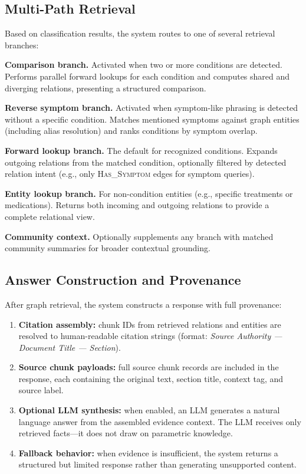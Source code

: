 \documentclass[12pt,a4paper]{article}
\begin{document}
\subsection{Multi-Path Retrieval}

Based on classification results, the system routes to one of several retrieval branches:

\textbf{Comparison branch.} Activated when two or more conditions are detected. Performs parallel forward lookups for each condition and computes shared and diverging relations, presenting a structured comparison.

\textbf{Reverse symptom branch.} Activated when symptom-like phrasing is detected without a specific condition. Matches mentioned symptoms against graph entities (including alias resolution) and ranks conditions by symptom overlap.

\textbf{Forward lookup branch.} The default for recognized conditions. Expands outgoing relations from the matched condition, optionally filtered by detected relation intent (e.g., only \textsc{Has\_Symptom} edges for symptom queries).

\textbf{Entity lookup branch.} For non-condition entities (e.g., specific treatments or medications). Returns both incoming and outgoing relations to provide a complete relational view.

\textbf{Community context.} Optionally supplements any branch with matched community summaries for broader contextual grounding.

\subsection{Answer Construction and Provenance}

After graph retrieval, the system constructs a response with full provenance:

\begin{enumerate}[nosep]
    \item \textbf{Citation assembly:} chunk IDs from retrieved relations and entities are resolved to human-readable citation strings (format: \textit{Source Authority --- Document Title --- Section}).
    \item \textbf{Source chunk payloads:} full source chunk records are included in the response, each containing the original text, section title, context tag, and source label.
    \item \textbf{Optional LLM synthesis:} when enabled, an LLM generates a natural language answer from the assembled evidence context. The LLM receives only retrieved facts---it does not draw on parametric knowledge.
    \item \textbf{Fallback behavior:} when evidence is insufficient, the system returns a structured but limited response rather than generating unsupported content.
\end{enumerate}
\end{document}
